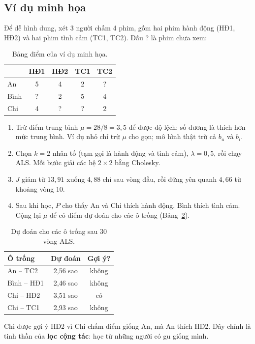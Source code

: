 \subsection{Ví dụ minh họa}

Để dễ hình dung, xét 3 người chấm 4 phim, gồm hai phim hành động (HĐ1, HĐ2) và hai phim tình cảm (TC1, TC2).
Dấu ? là phim chưa xem:
\begin{table}[H]
  \centering
  \begin{tabular}{lcccc}
    \hline
         & HĐ1 & HĐ2 & TC1 & TC2 \\
    \hline
    An   & 5 & 4 & 2 & ? \\
    Bình & ? & 2 & 5 & 4 \\
    Chi  & 4 & ? & ? & 2 \\
    \hline
  \end{tabular}
  \caption{Bảng điểm của ví dụ minh họa.}
  \label{tab:als-toy}
\end{table}
\begin{enumerate}
  \item Trừ điểm trung bình $\mu = 28/8 = 3{,}5$ để được độ lệch: số dương là thích hơn mức trung bình.
        Ví dụ nhỏ chỉ trừ $\mu$ cho gọn; mô hình thật trừ cả $b_u$ và $b_i$.
  \item Chọn $k = 2$ nhân tố (tạm gọi là hành động và tình cảm), $\lambda = 0{,}5$, rồi chạy ALS. Mỗi bước
        giải các hệ $2 \times 2$ bằng Cholesky.
  \item $J$ giảm từ $13{,}91$ xuống $4{,}88$ chỉ sau vòng đầu, rồi đứng yên quanh $4{,}66$ từ khoảng
        vòng 10.
  \item Sau khi học, $P$ cho thấy An và Chi thích hành động, Bình thích tình cảm. Cộng lại $\mu$ để có điểm
        dự đoán cho các ô trống (Bảng~\ref{tab:als-toy-pred}).
\end{enumerate}
\begin{table}[H]
  \centering
  \begin{tabular}{lcc}
    \hline
    Ô trống & Dự đoán & Gợi ý? \\
    \hline
    An -- TC2   & 2,56 sao & không \\
    Bình -- HĐ1 & 2,46 sao & không \\
    Chi -- HĐ2  & 3,51 sao & có \\
    Chi -- TC1  & 2,93 sao & không \\
    \hline
  \end{tabular}
  \caption{Dự đoán cho các ô trống sau 30 vòng ALS.}
  \label{tab:als-toy-pred}
\end{table}
Chi được gợi ý HĐ2 vì Chi chấm điểm giống An, mà An thích HĐ2. Đây chính là tinh thần của \textbf{lọc cộng
tác}: học từ những người có gu giống mình.

